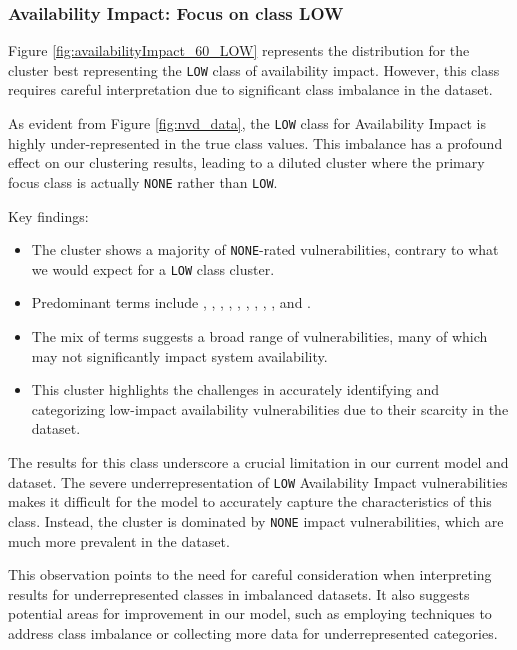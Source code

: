 \documentclass[12pt]{article}
\begin{document}
\subsubsection{Availability Impact: Focus on class LOW}

Figure \ref{fig:availabilityImpact_60_LOW} represents the distribution for the cluster best
representing the \texttt{LOW} class of availability impact. However, this class requires
careful interpretation due to significant class imbalance in the dataset.

As evident from Figure \ref{fig:nvd_data}, the \texttt{LOW} class for Availability Impact is
highly under-represented in the true class values. This imbalance has a profound effect on our
clustering results, leading to a diluted cluster where the primary focus class is actually
\texttt{NONE} rather than \texttt{LOW}.

Key findings:

\begin{itemize}

	\item The cluster shows a majority of \texttt{NONE}-rated vulnerabilities, contrary to what we
	      would expect for a \texttt{LOW} class cluster.

	\item Predominant terms include , , , , , ,
	      , , , and .

	\item The mix of terms suggests a broad range of vulnerabilities, many of which may not
	      significantly impact system availability.

	\item This cluster highlights the challenges in accurately identifying and categorizing
	      low-impact availability vulnerabilities due to their scarcity in the dataset.

\end{itemize}

The results for this class underscore a crucial limitation in our current model and dataset. The
severe underrepresentation of \texttt{LOW} Availability Impact vulnerabilities makes it difficult
for the model to accurately capture the characteristics of this class. Instead, the cluster is
dominated by \texttt{NONE} impact vulnerabilities, which are much more prevalent in the dataset.

This observation points to the need for careful consideration when interpreting results for
underrepresented classes in imbalanced datasets. It also suggests potential areas for improvement in
our model, such as employing techniques to address class imbalance or collecting more data for
underrepresented categories.
\end{document}
